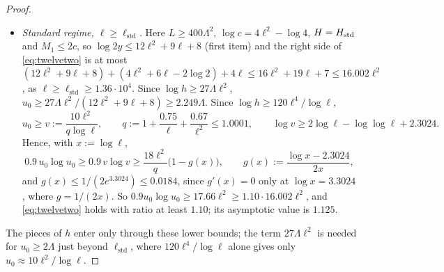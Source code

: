 \begin{proof}
\begin{itemize}
\begin{itemize}
  \item If $L\ge400\Lambda^2$, then $\log h\ge50\Lambda^2$, so $U\ge50\Lambda/(3.01\gamma)\ge50\Lambda/22.575\ge2.214\Lambda$, and the
    claim reads $\log U\ge4.02\cdot3.01\gamma^2/45$, which is implied by $\log U\ge0.2689\gamma^2$. Its left side is $\ge\log(2.214\cdot10^8)\ge19.21$ and its right
    side is $\le0.2689\cdot7.5^2\le15.13$; the ratio of the two sides of \eqref{eq:twelvetwo} is therefore at least
    $19.21/15.13\ge1.26$.
  \end{itemize}
  In both cases $u_0\ge2.214\Lambda\ge100$.
\item \emph{Standard regime, $\ell\ge\ell_{\mathrm{std}}$.} Here $L\ge400\Lambda^2$, $\log c=4\ell^2-\log4$, $H=H_{\mathrm{std}}$ and $M_1\le2c$,
  so $\log2y\le12\ell^2+9\ell+8$ (first item) and the right side of \eqref{eq:twelvetwo} is at most
  $(12\ell^2+9\ell+8)+(4\ell^2+6\ell-2\log2)+4\ell\le16\ell^2+19\ell+7\le16.002\ell^2$, as $\ell\ge\ell_{\mathrm{std}}\ge1.36\cdot10^4$.
  Since $\log h\ge27\Lambda\ell^2$, $u_0\ge27\Lambda\ell^2/(12\ell^2+9\ell+8)\ge2.249\Lambda$. Since $\log h\ge120\ell^4/\log\ell$,
  \[
  u_0\ge v:=\frac{10\ell^2}{q\log\ell},\qquad q:=1+\frac{0.75}\ell+\frac{0.67}{\ell^2}\le1.0001,\qquad
  \log v\ge2\log\ell-\log\log\ell+2.3024 .
  \]
  Hence, with $x:=\log\ell$,
  \[
  0.9\,u_0\log u_0\ge0.9\,v\log v\ge\frac{18\ell^2}{q}\bigl(1-g(x)\bigr),\qquad g(x):=\frac{\log x-2.3024}{2x},
  \]
  and $g(x)\le1/(2e^{3.3024})\le0.0184$, since $g'(x)=0$ only at $\log x=3.3024$, where $g=1/(2x)$. So $0.9u_0\log u_0\ge17.66\ell^2\ge1.10\cdot16.002\ell^2$, and \eqref{eq:twelvetwo} holds
  with ratio at least $1.10$; its asymptotic value is $1.125$.
\end{itemize}
The pieces of $h$ enter only through these lower bounds; the term $27\Lambda\ell^2$ is needed for $u_0\ge2\Lambda$ just beyond
$\ell_{\mathrm{std}}$, where $120\ell^4/\log\ell$ alone gives only $u_0\approx10\ell^2/\log\ell$.


\end{proof}
